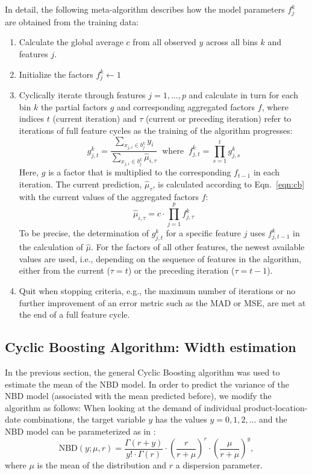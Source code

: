 \documentclass[BCOR=1mm, DIV=calc,10pt,
twoside=true,
twocolumn,
headings=normal]{scrartcl}
\newcommand{\eqn}{Eqn.~}
\begin{document}
In detail, the following meta-algorithm describes how the model parameters $f^k_j$ are obtained from the training data:
\begin{enumerate}
\item{Calculate the global average $c$ from all observed $y$ across all bins $k$ and features $j$.}
\item{Initialize the factors $f^k_j \leftarrow 1$}
\item{Cyclically iterate through features $j = 1,...,p $ and calculate in turn for each bin $k$ the partial factors $g$ and corresponding aggregated factors $f$, where indices $t$ (current iteration) and $\tau$ (current or preceding iteration) refer to iterations of full feature cycles as the training of the algorithm progresses:
\begin{equation} \label{eqn:factors}
g^k_{j,t} = \frac{\sum \limits_{x_{j,i} \in b^k_j} y_i}{\sum \limits_{x_{j,i} \in b^k_j} \hat{\mu}_{i,\tau}}\;\; \mathrm{where} \; \; f^k_{j,t} = \prod \limits_{s=1}^t g^k_{j,s}
\end{equation}
Here,  $g$ is a factor that is multiplied to the corresponding $f_{t-1}$ in each iteration. The current prediction, $\hat{\mu}_\tau$, is calculated according to \eqn \eqref{eqn:cb} with the current values of the aggregated factors $f$:
\begin{equation}
\hat{\mu}_{i,\tau} = c \cdot \prod \limits_{j=1}^p f^k_{j,\tau}
\end{equation}
To be precise, the determination of $g^k_{j,t}$ for a specific feature $j$ uses $f^k_{j,t-1}$ in the calculation of $\hat{\mu}$. For the factors of all other features, the newest available values are used, i.e., depending on the sequence of features in the algorithm, either from the current ($\tau=t$) or the preceding iteration ($\tau=t-1$).}
\item{Quit when stopping criteria, e.g., the maximum number of iterations or no further improvement of an error metric such as the MAD or MSE, are met at the end of a full feature cycle.}
\end{enumerate}

\subsection{Cyclic Boosting Algorithm: Width estimation}
\label{sec:cb_width}

In the previous section, the general Cyclic Boosting algorithm was used to estimate the mean of the NBD model. In order to predict the variance of the NBD model (associated with the mean predicted before), we modify the algorithm as follows: When looking at the demand of individual product-location-date combinations, the target variable $y$ has the values $y = 0, 1, 2, ...$ and the NBD model can be parameterized as in \cite{hilbe2011negative}:
\begin{equation} \label{eqn:nbinom}
\mathrm{NBD}(y; \mu, r) = \frac{\Gamma(r + y)}{y! \cdot \Gamma(r)} \cdot \left(\frac{r}{r + \mu}\right)^r \cdot \left(\frac{\mu}{r + \mu}\right)^y,
\end{equation}
where $\mu$ is the mean of the distribution and $r$ a dispersion parameter.
\end{document}
